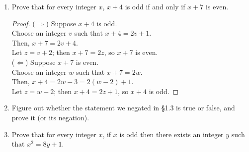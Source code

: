 \documentclass{article}
\begin{document}
\begin{enumerate}
\begin{enumerate}
    \end{enumerate}
  \item Prove that for every integer $x$, $x + 4$ is odd if and only
    if $x + 7$ is even.

    \begin{proof}
      ($\Rightarrow$) Suppose $x+4$ is odd. \\
      Choose an integer $v$ such that $x+4=2v+1$. \\
      Then, $x+7 = 2v+4$. \\
      Let $z=v+2$; then $x+7 = 2z$, so $x+7$ is even. \\
      ($\Leftarrow$) Suppose $x+7$ is even. \\
      Choose an integer $w$ such that $x+7=2w$. \\
      Then, $x+4=2w-3=2(w-2)+1$. \\
      Let $z=w-2$; then $x+4=2z+1$, so $x+4$ is odd.
    \end{proof}

  \item Figure out whether the statement we negated in \S1.3 is true
    or false, and prove it (or its negation).


  \item Prove that for every integer $x$, if $x$ is odd then there
    exists an integer $y$ such that $x^2 = 8y + 1$.

\end{enumerate}
\end{document}
